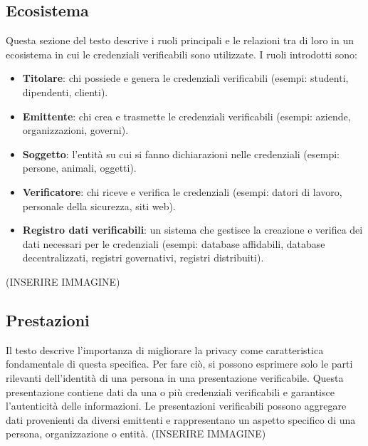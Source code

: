 \subsection{Ecosistema}
Questa sezione del testo descrive i ruoli principali e le relazioni tra di loro in un ecosistema in cui le credenziali verificabili sono utilizzate. I ruoli introdotti sono:
\begin{itemize}
\item \textbf{Titolare}: chi possiede e genera le credenziali verificabili (esempi: studenti, dipendenti, clienti).\\
\item \textbf{Emittente}: chi crea e trasmette le credenziali verificabili (esempi: aziende, organizzazioni, governi).\\
\item \textbf{Soggetto}: l'entità su cui si fanno dichiarazioni nelle credenziali (esempi: persone, animali, oggetti).\\
\item \textbf{Verificatore}: chi riceve e verifica le credenziali (esempi: datori di lavoro, personale della sicurezza, siti web).\\
\item \textbf{Registro dati verificabili}: un sistema che gestisce la creazione e verifica dei dati necessari per le credenziali (esempi: database affidabili, database decentralizzati, 
registri governativi, registri distribuiti).\\
\end{itemize}

(INSERIRE IMMAGINE)

\subsection{Prestazioni}
Il testo descrive l'importanza di migliorare la privacy come caratteristica fondamentale di questa specifica. Per fare ciò, si possono esprimere solo le parti rilevanti 
dell'identità di una persona in una presentazione verificabile. Questa presentazione contiene dati da una o più credenziali verificabili e garantisce l'autenticità delle informazioni. 
Le presentazioni verificabili possono aggregare dati provenienti da diversi emittenti e rappresentano un aspetto specifico di una persona, organizzazione o entità.
(INSERIRE IMMAGINE)

